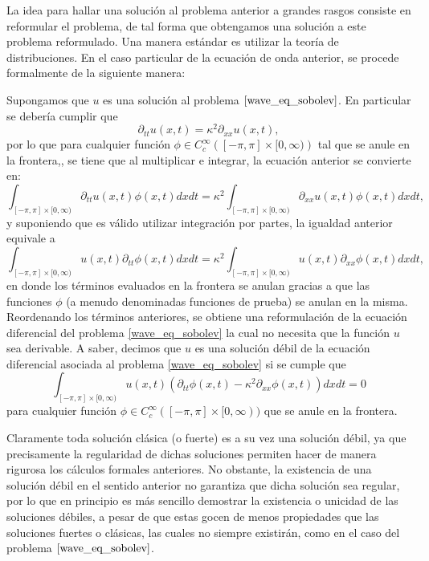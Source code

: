 \documentclass[letterpaper,twoside]{book}
\newcommand{\1}{\mathds{1}}
\theoremstyle{definition}
\theoremstyle{definition}
\theoremstyle{definition}
\theoremstyle{definition}
\theoremstyle{definition}
\theoremstyle{definition}
\theoremstyle{definition}
\begin{document}
La idea para hallar una solución al problema anterior a grandes rasgos consiste en reformular el problema, de tal forma que obtengamos una solución a este problema reformulado. Una manera estándar es utilizar la teoría de distribuciones. En el caso particular de la ecuación de onda anterior, se procede formalmente de la siguiente manera:

Supongamos que $u$ es una solución al problema $\eqref{wave_eq_sobolev}$. En particular se debería cumplir que 
\[
\partial_{tt}u(x,t)=\kappa^2\partial_{xx}u(x,t),
\]
por lo que para cualquier función $\phi\in C^{\infty}_c\left([-\pi,\pi]\times [0,\infty)\right)$ tal que se anule en la frontera,, se tiene que al multiplicar e integrar, la ecuación anterior se convierte en:
\[
    \int_{[-\pi,\pi]\times [0,\infty)}\partial_{tt}u(x,t)\phi(x,t)dx dt=\kappa^2\int_{[-\pi,\pi]\times [0,\infty)}\partial_{xx}u(x,t)\phi(x,t)dx dt,
\]
y suponiendo que es válido utilizar integración por partes, la igualdad anterior equivale a
\[
\int_{[-\pi,\pi]\times [0,\infty)}u(x,t)\partial_{tt}\phi(x,t)dx dt=\kappa^2\int_{[-\pi,\pi]\times [0,\infty)}u(x,t)\partial_{xx}\phi(x,t)dx dt,
\]
en donde los términos evaluados en la frontera se anulan gracias a que las funciones $\phi$ (a menudo denominadas funciones de prueba) se anulan en la misma. Reordenando los términos anteriores, se obtiene una reformulación de la ecuación diferencial del problema \eqref{wave_eq_sobolev} la cual no necesita que la función $u$ sea derivable. A saber, decimos que $u$ es una solución débil de la ecuación diferencial asociada al problema \eqref{wave_eq_sobolev} si se cumple que 
\[
\int_{[-\pi,\pi]\times [0,\infty)}u(x,t)(\partial_{tt}\phi(x,t)-\kappa^2\partial_{xx}\phi(x,t))dx dt=0    
\]
para cualquier función $\phi\in C^{\infty}_c([-\pi,\pi]\times [0,\infty))$ que se anule en la frontera.

Claramente toda solución clásica (o fuerte) es a su vez una solución débil, ya que precisamente la regularidad de dichas soluciones permiten hacer de manera rigurosa los cálculos formales anteriores.
No obstante, la existencia de una solución débil en el sentido anterior no garantiza que dicha solución sea regular, por lo que en principio es más sencillo demostrar la existencia o unicidad de las soluciones débiles, a pesar de que estas gocen de menos propiedades que las soluciones fuertes o clásicas, las cuales no siempre existirán, como en el caso del problema $\eqref{wave_eq_sobolev}$.
\end{document}
